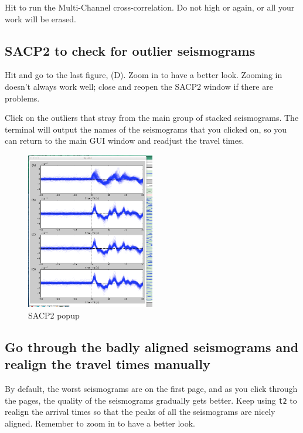 \documentclass[letterpaper,10pt]{article}
\begin{document}
Hit  to run the Multi-Channel cross-correlation. Do not high  or  again, or all your work will be erased. 


\subsection{SACP2 to check for outlier seismograms}

Hit  and go to the last figure, (D). Zoom in to have a better look. Zooming in doesn't always work well; close and reopen the SACP2 window if there are problems. 

Click on the outliers that stray from the main group of stacked seismograms. The terminal will output the names of the seismograms that you clicked on, so you can return to the main GUI window and readjust the travel times.

\begin{figure}[h!]
  \centering
  \includegraphics[width=0.5\textwidth]{images/SACP2_popup}
  \caption{SACP2 popup}
  \label{fig:SACP2_popup}
\end{figure}


\subsection{Go through the badly aligned seismograms and realign the travel times manually}

By default, the worst seismograms are on the first page, and as you click through the pages, the quality of the seismograms gradually gets better. Keep using \texttt{t2} to realign the arrival times so that the peaks of all the seismograms are nicely aligned. Remember to zoom in to have a better look.
\end{document}
